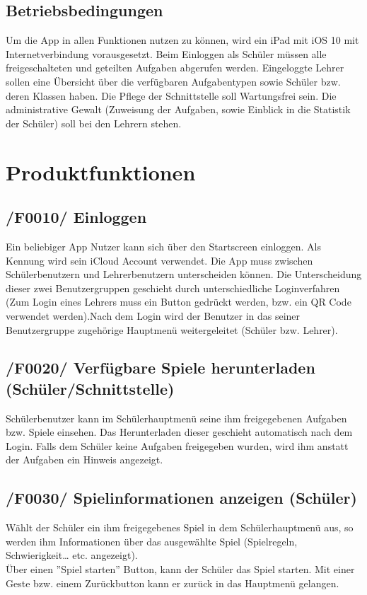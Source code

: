 \subsection{Betriebsbedingungen}
Um die App in allen Funktionen nutzen zu können, wird ein iPad mit iOS 10 mit Internetverbindung vorausgesetzt. Beim Einloggen als Schüler müssen alle freigeschalteten und geteilten Aufgaben abgerufen werden. Eingeloggte Lehrer sollen eine Übersicht über die verfügbaren Aufgabentypen sowie Schüler bzw. deren Klassen haben. Die Pflege der Schnittstelle soll Wartungsfrei sein. Die administrative Gewalt (Zuweisung der Aufgaben, sowie Einblick in die Statistik der Schüler) soll bei den Lehrern stehen.



\section{Produktfunktionen}
\subsection{/F0010/ Einloggen}
Ein beliebiger App Nutzer kann sich über den Startscreen einloggen. 
Als Kennung wird sein iCloud Account verwendet. Die App muss zwischen Schülerbenutzern und Lehrerbenutzern unterscheiden können. Die Unterscheidung dieser zwei Benutzergruppen geschieht durch unterschiedliche Loginverfahren (Zum Login eines Lehrers muss ein Button gedrückt werden,  bzw. ein QR Code verwendet werden).Nach dem Login wird der Benutzer in das seiner Benutzergruppe zugehörige Hauptmenü weitergeleitet (Schüler bzw. Lehrer).


\subsection{/F0020/ Verfügbare Spiele herunterladen (Schüler/Schnittstelle)}
Schülerbenutzer kann im Schülerhauptmenü seine ihm freigegebenen Aufgaben bzw. Spiele einsehen. Das Herunterladen dieser geschieht automatisch nach dem Login. Falls dem Schüler keine Aufgaben freigegeben wurden, wird ihm anstatt der Aufgaben ein Hinweis angezeigt.


\subsection{/F0030/ Spielinformationen anzeigen (Schüler)}
Wählt der Schüler ein ihm freigegebenes Spiel in dem Schülerhauptmenü aus, so werden ihm Informationen über das ausgewählte Spiel (Spielregeln, Schwierigkeit… etc. angezeigt).\\
Über einen ''Spiel starten'' Button, kann der Schüler das Spiel starten. Mit einer Geste bzw. einem Zurückbutton kann er zurück in das Hauptmenü gelangen.


